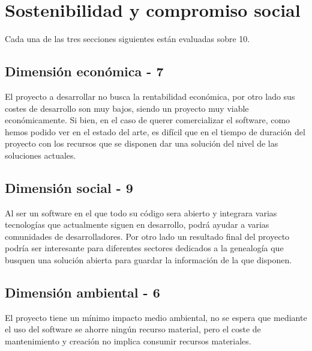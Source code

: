 \newpage

\section{Sostenibilidad y compromiso social}
Cada una de las tres secciones siguientes están evaluadas sobre 10.
\subsection{Dimensión económica - 7}
El proyecto a desarrollar no busca la rentabilidad económica, por otro lado sus costes de desarrollo son muy bajos, siendo un proyecto muy viable económicamente. Si bien, en el caso de querer comercializar el software, como hemos podido ver en el estado del arte, es difícil que en el tiempo de duración del proyecto con los recursos que se disponen dar una solución del nivel de las soluciones actuales.
\subsection{Dimensión social - 9}
Al ser un software en el que todo su código sera abierto y integrara varias tecnologías que actualmente siguen en desarrollo, podrá ayudar a varias comunidades de desarrolladores. Por otro lado un resultado final del proyecto podría ser interesante para diferentes sectores dedicados a la genealogía que busquen una solución abierta para guardar la información de la que disponen.
\subsection{Dimensión ambiental - 6}
El proyecto tiene un mínimo impacto medio ambiental, no se espera que mediante el uso del software se ahorre ningún recurso material, pero el coste de mantenimiento y creación no implica consumir recursos materiales.